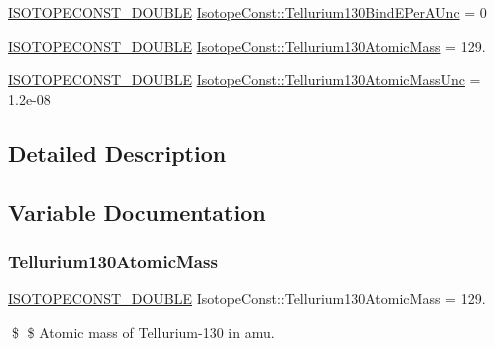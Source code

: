 \begin{DoxyCompactItemize}
\mbox{\hyperlink{group___isotope_const-_macros_ga8f45a7272ce02c0b4c65c44636ed719a}{I\+S\+O\+T\+O\+P\+E\+C\+O\+N\+S\+T\+\_\+\+D\+O\+U\+B\+LE}} \mbox{\hyperlink{group___isotope_const-_tellurium-_te130_ga9f05e871a8b58822dde6a29ea5a83d02}{Isotope\+Const\+::\+Tellurium130\+Bind\+E\+Per\+A\+Unc}} = 0
\item 
\mbox{\hyperlink{group___isotope_const-_macros_ga8f45a7272ce02c0b4c65c44636ed719a}{I\+S\+O\+T\+O\+P\+E\+C\+O\+N\+S\+T\+\_\+\+D\+O\+U\+B\+LE}} \mbox{\hyperlink{group___isotope_const-_tellurium-_te130_gabaaf4108250ff3d201a3b754ac24d3fa}{Isotope\+Const\+::\+Tellurium130\+Atomic\+Mass}} = 129.
\item 
\mbox{\hyperlink{group___isotope_const-_macros_ga8f45a7272ce02c0b4c65c44636ed719a}{I\+S\+O\+T\+O\+P\+E\+C\+O\+N\+S\+T\+\_\+\+D\+O\+U\+B\+LE}} \mbox{\hyperlink{group___isotope_const-_tellurium-_te130_gaa20a73ca49ef98c95ed820b3bbfa69b0}{Isotope\+Const\+::\+Tellurium130\+Atomic\+Mass\+Unc}} = 1.\+2e-\/08
\end{DoxyCompactItemize}


\subsection{Detailed Description}


\subsection{Variable Documentation}
\mbox{\label{group___isotope_const-_tellurium-_te130_gabaaf4108250ff3d201a3b754ac24d3fa}} 
\subsubsection{\texorpdfstring{Tellurium130\+Atomic\+Mass}{Tellurium130AtomicMass}}
{\footnotesize\ttfamily \mbox{\hyperlink{group___isotope_const-_macros_ga8f45a7272ce02c0b4c65c44636ed719a}{I\+S\+O\+T\+O\+P\+E\+C\+O\+N\+S\+T\+\_\+\+D\+O\+U\+B\+LE}} Isotope\+Const\+::\+Tellurium130\+Atomic\+Mass = 129.}

\$ \$ Atomic mass of Tellurium-\/130 in amu. \mbox{\label{group___isotope_const-_tellurium-_te130_gaa20a73ca49ef98c95ed820b3bbfa69b0}} 
